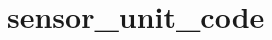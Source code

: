 \documentclass[main]{subfiles}
\begin{document}
\chapter{sensor\_unit\_code}
\label{lst:sensor_unit_code}
\inputminted[linenos,breaklines]{c}{code/a.c}
 
\end{document}
